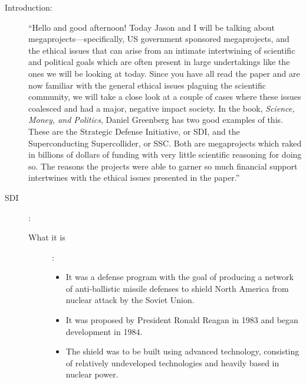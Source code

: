 \documentclass[12pt]{article}
\begin{document}
\thispagestyle{fancy}
\vspace*{0.25in}


\begin{description}

  \item[Introduction:] ``Hello and good afternoon! Today Jason and I will be
    talking about megaprojects---specifically, US government sponsored
    megaprojects, and the ethical issues that can arise from an intimate
    intertwining of scientific and political goals which are often present in
    large undertakings like the ones we will be looking at today. Since you
    have all read the paper and are now familiar with the general ethical
    issues plaguing the scientific community, we will take a close look at a
    couple of cases where these issues coalesced and had a major, negative
    impact society. In the book, \emph{Science, Money, and Politics}, Daniel
    Greenberg has two good examples of this. These are the Strategic Defense
    Initiative, or SDI, and the Superconducting Supercollider, or SSC. Both
    are megaprojects which raked in billions of dollars of funding with very
    little scientific reasoning for doing so. The reasons the projects were
    able to garner so much financial support intertwines with the ethical
    issues presented in the paper.''

  \item[SDI]:
    \begin{description}

      \item[What it is]: 
        \begin{itemize}

          \item It was a defense program with the goal of producing a network
            of anti-ballistic missile defenses to shield North America from
            nuclear attack by the Soviet Union.

          \item It was proposed by President Ronald Reagan in 1983 and began
            development in 1984.

          \item The shield was to be built using advanced technology,
            consisting of relatively undeveloped technologies and heavily based
            in nuclear power.


\end{itemize}
\end{description}
\end{description}
\end{document}
